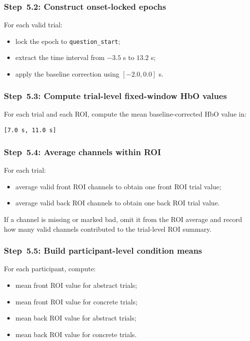 \subsubsection{Step~5.2: Construct onset-locked epochs}
For each valid trial:
\begin{itemize}
    \item lock the epoch to \texttt{question\_start};
    \item extract the time interval from \(-3.5\) s to \(13.2\) s;
    \item apply the baseline correction using \([-2.0, 0.0]\) s.
\end{itemize}

\subsubsection{Step~5.3: Compute trial-level fixed-window HbO values}
For each trial and each ROI, compute the mean baseline-corrected HbO value in:
\begin{verbatim}
[7.0 s, 11.0 s]
\end{verbatim}

\subsubsection{Step~5.4: Average channels within ROI}
For each trial:
\begin{itemize}
    \item average valid front ROI channels to obtain one front ROI trial value;
    \item average valid back ROI channels to obtain one back ROI trial value.
\end{itemize}

If a channel is missing or marked bad, omit it from the ROI average and record how many valid channels
contributed to the trial-level ROI summary.

\subsubsection{Step~5.5: Build participant-level condition means}
For each participant, compute:
\begin{itemize}
    \item mean front ROI value for abstract trials;
    \item mean front ROI value for concrete trials;
    \item mean back ROI value for abstract trials;
    \item mean back ROI value for concrete trials.
\end{itemize}

